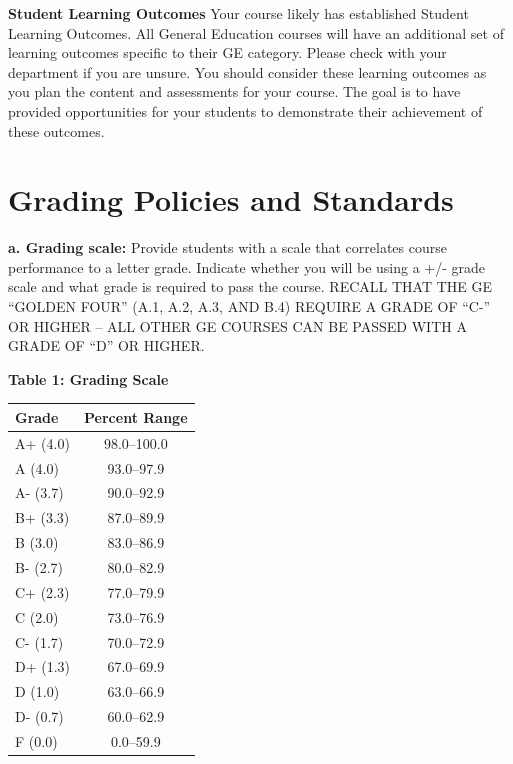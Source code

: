 \documentclass[12pt]{article}
\begin{document}
\vspace{1em}

\noindent \textbf{Student Learning Outcomes} {\color{annotationblue}Your course likely has established Student Learning Outcomes. All General Education courses will have an additional set of learning outcomes specific to their GE category. Please check with your department if you are unsure. You should consider these learning outcomes as you plan the content and assessments for your course. The goal is to have provided opportunities for your students to demonstrate their achievement of these outcomes.}

\section*{Grading Policies and Standards}

\noindent \textbf{a. Grading scale:} {\color{annotationblue}Provide students with a scale that correlates course performance to a letter grade. Indicate whether you will be using a +/- grade scale and what grade is required to pass the course. RECALL THAT THE GE ``GOLDEN FOUR'' (A.1, A.2, A.3, AND B.4) REQUIRE A GRADE OF ``C-'' OR HIGHER -- ALL OTHER GE COURSES CAN BE PASSED WITH A GRADE OF ``D'' OR HIGHER.}

\vspace{0.5em}


\vspace{0.5em}

\begin{center}
\textbf{Table 1: Grading Scale}
\end{center}

\begin{center}
\begin{tabular}{|l|c|}
\hline
\textbf{Grade} & \textbf{Percent Range} \\
\hline
A+ (4.0) & 98.0--100.0 \\
A  (4.0) & 93.0--97.9 \\
A- (3.7) & 90.0--92.9 \\
B+ (3.3) & 87.0--89.9 \\
B  (3.0) & 83.0--86.9 \\
B- (2.7) & 80.0--82.9 \\
C+ (2.3) & 77.0--79.9 \\
C  (2.0) & 73.0--76.9 \\
C- (1.7) & 70.0--72.9 \\
D+ (1.3) & 67.0--69.9 \\
D  (1.0) & 63.0--66.9 \\
D- (0.7) & 60.0--62.9 \\
F  (0.0) & 0.0--59.9 \\
\hline
\end{tabular}
\end{center}
\end{document}
